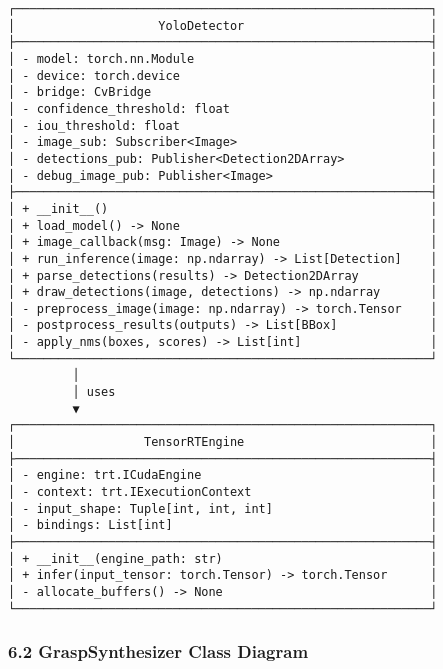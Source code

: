 \documentclass[
]{article}
\begin{document}
\begin{verbatim}
┌──────────────────────────────────────────────────────────┐
│                    YoloDetector                          │
├──────────────────────────────────────────────────────────┤
│ - model: torch.nn.Module                                 │
│ - device: torch.device                                   │
│ - bridge: CvBridge                                       │
│ - confidence_threshold: float                            │
│ - iou_threshold: float                                   │
│ - image_sub: Subscriber<Image>                           │
│ - detections_pub: Publisher<Detection2DArray>            │
│ - debug_image_pub: Publisher<Image>                      │
├──────────────────────────────────────────────────────────┤
│ + __init__()                                             │
│ + load_model() -> None                                   │
│ + image_callback(msg: Image) -> None                     │
│ + run_inference(image: np.ndarray) -> List[Detection]    │
│ + parse_detections(results) -> Detection2DArray          │
│ + draw_detections(image, detections) -> np.ndarray       │
│ - preprocess_image(image: np.ndarray) -> torch.Tensor    │
│ - postprocess_results(outputs) -> List[BBox]             │
│ - apply_nms(boxes, scores) -> List[int]                  │
└──────────────────────────────────────────────────────────┘
         │
         │ uses
         ▼
┌──────────────────────────────────────────────────────────┐
│                  TensorRTEngine                          │
├──────────────────────────────────────────────────────────┤
│ - engine: trt.ICudaEngine                                │
│ - context: trt.IExecutionContext                         │
│ - input_shape: Tuple[int, int, int]                      │
│ - bindings: List[int]                                    │
├──────────────────────────────────────────────────────────┤
│ + __init__(engine_path: str)                             │
│ + infer(input_tensor: torch.Tensor) -> torch.Tensor      │
│ - allocate_buffers() -> None                             │
└──────────────────────────────────────────────────────────┘
\end{verbatim}

\hypertarget{graspsynthesizer-class-diagram}{%
\subsubsection{6.2 GraspSynthesizer Class
Diagram}\label{graspsynthesizer-class-diagram}}
\end{document}
